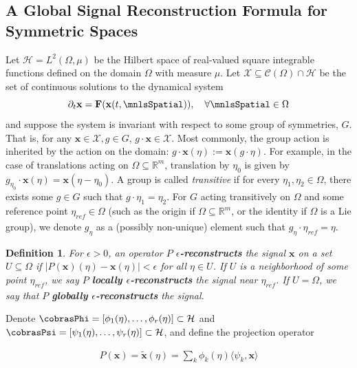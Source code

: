 \documentclass[twocolumn,10pt]{article}
\newtheorem{definition}[theorem]{Definition}
\begin{document}
\subsection{A Global Signal Reconstruction Formula for Symmetric Spaces}
Let $\mathcal H = L^2(\Omega, \mu)$ be the Hilbert space of real-valued square integrable functions defined on the domain $\Omega$ with measure $\mu$. Let $\mathcal X \subseteq \mathcal{C}(\Omega) \cap \mathcal H$ be the set of continuous solutions to the dynamical system  
$$
\partial_t  \mathbf x 
    =\mathbf F(\mathbf x(t,\mnlsSpatial))
    ,\quad 
    \forall \mnlsSpatial \in \Omega
$$
\noindent and suppose the system is invariant with respect to some group of symmetries, $G$. That is, for any $\mathbf x \in \mathcal X, g\in G$, $g \cdot \mathbf x \in \mathcal X$. Most commonly, the group action is inherited by the action on the domain: $g \cdot \mathbf x(\eta) := \mathbf x(g\cdot \eta)$. 
%
For example, in the case of translations acting on $\Omega \subseteq \mathbb R^m$, translation by $\eta_0$ is given by $g_{\eta_0} \cdot \mathbf x(\eta) = \mathbf x(\eta - \eta_0)$.  A group is called \textit{transitive} if for every $\eta_1, \eta_2 \in \Omega$, there exists some $g \in G$ such that $g\cdot \eta_1 = \eta_2$. 
%
For $G$ acting transitively on $\Omega$ and some reference point $\eta_{\textit{ref}} \in \Omega$ (such as the origin if $\Omega \subseteq \mathbb R^m$, or the identity if $\Omega$ is a Lie group), we denote $g_\eta$ as a (possibly non-unique) element such that $g_\eta \cdot \eta_{\textit{ref}} = \eta$.


\begin{definition} \label{si_def:eps_recon}
    For $\epsilon > 0$, an operator $P$ \textbf{ $\epsilon$-reconstructs} the signal $\mathbf x$ on a set $U \subseteq \Omega$  if $|P(\mathbf x)(\eta) - \mathbf x(\eta)| < \epsilon$ for all $\eta \in U$. If $U$ is a neighborhood of some point $\eta_{\textit{ref}}$, we say $P$ \textbf{locally $\epsilon$-reconstructs} the signal near $\eta_{\textit{ref}}$. 
    If $U = \Omega$, we say that $P$  \textbf{globally $\epsilon$-reconstructs} the signal.
\end{definition}

Denote  $\cobrasPhi = [\phi_1(\eta), \dots, \phi_r(\eta)] \subset \mathcal H$ and $\cobrasPsi = [\psi_1(\eta), \dots, \psi_r(\eta)] \subset \mathcal H$, and define the projection operator  

\begin{align}
\label{eq:si_local_recon}
    P(\mathbf x) = \mathbf{\tilde x}(\eta) = \sum_k \phi_k(\eta) \langle \psi_k, \mathbf x\rangle    
\end{align}
\end{document}
